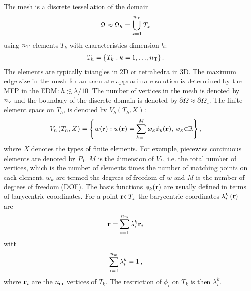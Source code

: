 \documentclass[a4paper]{article}
\numberwithin{equation}{section}
\begin{document}
The mesh is a discrete tessellation of the domain
\begin{align}
\Omega \approx \Omega_h= \bigcup_{k=1}^{n_{\mathrm{T}}} T_k
\end{align}
using $n_{\mathrm{T}}$ elements $T_k$ with characteristics dimension $h$:
\begin{align}
T_h = \left\{T_k:k=1,{\dots},n_{\mathrm{T}}\right\}.
\end{align}
The elements are typically triangles in 2D or tetrahedra in 3D. The maximum edge size 
in the mesh for an accurate approximate solution is determined by the MFP in the EDM: $h\lesssim\lambda/10$.
The number of vertices in the mesh is denoted by $n_{\mathrm{v}}$ and the boundary of the
discrete domain is denoted by $\partial\Omega\approx\partial\Omega_h$. The finite element
space on $T_h$, is denoted by $V_h\left(T_h,X\right)$:
\begin{align}
V_h\left(T_h,X\right)=\left\{w(\boldsymbol{\mathrm{r}}):w(\boldsymbol{\mathrm{r}})=\sum_{k=1}^M w_k\phi_k(\boldsymbol{\mathrm{r}}),\,w_k{\in}\mathbb{R}\right\},
\end{align}
where $X$ denotes the types of finite elements. For example, piecewise continuous elements 
are denoted by $P_1$. $M$ is the dimension of $V_h$, i.e. the total number of vertices, 
which is the number of elements times the number of matching points on each 
element. $w_k$ are termed the degrees of freedom of $w$ and $M$ is the number 
of degrees of freedom (DOF). The basis functions $\phi_k(\boldsymbol{\mathrm{r}})$ are usually defined in terms 
of barycentric coordinates. For a point $\boldsymbol{\mathrm{r}}{\in}T_k$ the barycentric coordinates  
$\lambda_i^k\left(\boldsymbol{\mathrm{r}}\right)$ are
\begin{align}
\boldsymbol{\mathrm{r}} = \sum_{i=1}^{n_{\mathrm{m}}} \lambda_i^k \boldsymbol{\mathrm{r}}_i
\end{align}
with
\begin{equation*}
\sum_{i=1}^{n_{\mathrm{m}}} \lambda _i^k=1\,,
\end{equation*}
where $\boldsymbol{\mathrm{r}}_i$ are the $n_{\mathrm{m}}$ vertices of $T_k$. The restriction of $\phi_i$ on $T_k$ is then $\lambda_i^k$.
\end{document}
